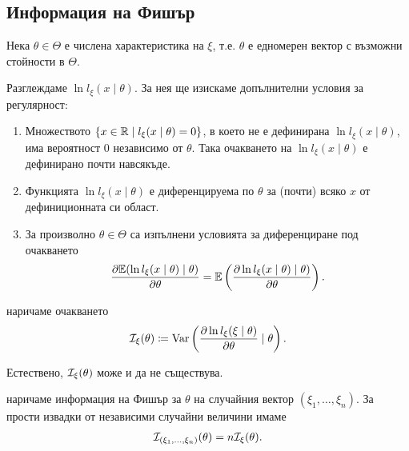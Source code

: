 \documentclass[numbers=endperiod, bibliography=totocnumbered]{scrartcl}
\begin{document}
\subsection{Информация на Фишър}

\begin{definition}\label{def:fisher-information}
  Нека \( \theta \in \Theta \) е числена характеристика на \( \xi \), т.е. \( \theta \) е едномерен вектор с възможни стойности в \( \Theta \).

  Разглеждаме  \( \ln l_\xi(x \mid \theta) \). За нея ще изискаме допълнителни условия за регулярност:
  \begin{enumerate}
    \item Множеството \( \{ x \in \mathbb{R} \mid l_\xi(x \mid \theta) = 0 \} \), в което не е дефинирана \( \ln l_\xi(x \mid \theta) \), има вероятност \( 0 \) независимо от \( \theta \). Така очакването на \( \ln l_\xi(x \mid \theta) \) е дефинирано почти навсякъде.
    \item Функцията \( \ln l_\xi(x \mid \theta) \) е диференцируема по \( \theta \) за (почти) всяко \( x \) от дефиниционната си област.
    \item За произволно \( \theta \in \Theta \) са изпълнени условията за диференциране под очакването
    \begin{align*}
      \frac {\partial \mathbb{E}(\ln l_\xi(x \mid \theta) \mid \theta)} {\partial \theta}
      =
      \mathbb{E}\left( \frac {\partial \ln l_\xi(x \mid \theta) \mid \theta)} {\partial \theta} \right).
    \end{align*}
  \end{enumerate}

   наричаме очакването
  \begin{align*}
    \mathcal{I}_\xi(\theta) \coloneqq \operatorname{Var}\left( \frac {\partial \ln l_\xi(\xi \mid \theta)} {\partial \theta} \mid \theta \right).
  \end{align*}

  Естествено, \( \mathcal{I}_\xi(\theta) \) може и да не съществува.

   наричаме информация на Фишър за \( \theta \) на случайния вектор \( (\xi_1, \ldots, \xi_n) \). За прости извадки от независими случайни величини имаме
  \begin{align*}
    \mathcal{I}_{(\xi_1, \ldots, \xi_n)}(\theta) = n \mathcal{I}_\xi(\theta).
  \end{align*}
\end{definition}
\end{document}
